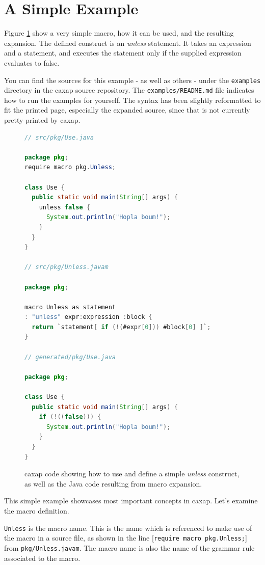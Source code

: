 \section{A Simple Example}
\label{simple_example}

Figure \ref{simple_macro_example} show a very simple macro, how it can be used,
and the resulting expansion. The defined construct is an \emph{unless}
statement. It takes an expression and a statement, and executes the statement
only if the supplied expression evaluates to false.

You can find the sources for this example - as well as others - under the
\texttt{examples} directory in the caxap source repository. The
\texttt{examples/README.md} file indicates how to run the examples for
yourself. The syntax has been slightly reformatted to fit the printed page,
especially the expanded source, since that is not currently pretty-printed by
caxap.

\begin{figure}[here]
\small
\begin{lstlisting}[language=Java, frame=single]
// src/pkg/Use.java

package pkg;
require macro pkg.Unless;

class Use {
  public static void main(String[] args) {
    unless false {
      System.out.println("Hopla boum!");
    }
  }
}

// src/pkg/Unless.javam

package pkg;

macro Unless as statement
: "unless" expr:expression :block {
  return `statement[ if (!(#expr[0])) #block[0] ]`;
}

// generated/pkg/Use.java

package pkg;

class Use {
  public static void main(String[] args) {
    if (!((false))) {
      System.out.println("Hopla boum!");
    }
  }
}

\end{lstlisting}
\caption{caxap code showing how to use and define a simple \emph{unless}
  construct, as well as the Java code resulting from macro expansion.}
\label{simple_macro_example}
\end{figure}

This simple example showcases most important concepts in caxap. Let's examine
the macro definition.

\texttt{Unless} is the macro name. This is the name which is referenced to make
use of the macro in a source file, as shown in the line [\texttt{require macro
  pkg.Unless;}] from \texttt{pkg/Unless.javam}. The macro name is also the name
of the grammar rule associated to the macro.

